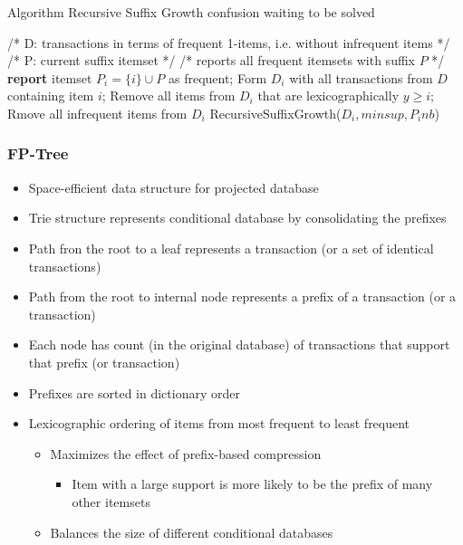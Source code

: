 \documentclass{article}
\begin{document}
\newpage

\begin{algorithm}
\caption{Algorithm Recursive Suffix Growth {\color{red} confusion waiting to be solved}}
\begin{algorithmic}[0]
\State /* D: transactions in terms of frequent 1-items, i.e. without infrequent items */
\State /* P: current suffix itemset */
\State /* reports all frequent itemsets with suffix $P$ */ \\

  \State \textbf{report} itemset $P_i = \{i\} \cup P$  as frequent;
  \State Form $D_i$ with all transactions from $D$ containing item $i$;
  \State Remove all items from $D_i$ that are lexicographically $y \ge i$;
  \State Rmove all infrequent items from $D_i$
    RecursiveSuffixGrowth($D_i, minsup, P_inb$)
  \EndIf
\EndFor
\EndFunction
\end{algorithmic}
\end{algorithm}

\subsubsection{FP-Tree}
\begin{itemize}
  \item Space-efficient data structure for projected database
  \item Trie structure represents conditional database by consolidating the prefixes
  \item Path fron the root to a leaf represents a transaction (or a set of identical transactions)
  \item Path from the root to internal node represents a prefix of a transaction (or a transaction)
  \item Each node has count (in the original database) of transactions that support that prefix (or transaction)
  \item Prefixes are sorted in dictionary order
  \item Lexicographic ordering of items from most frequent to least frequent
  \begin{itemize}
    \item Maximizes the effect of prefix-based compression
      \begin{itemize}
        \item Item with a large support is more likely to be the prefix of many other itemsets
      \end{itemize}
    \item Balances the size of different conditional databases
  \end{itemize}
\end{itemize}
\end{document}
